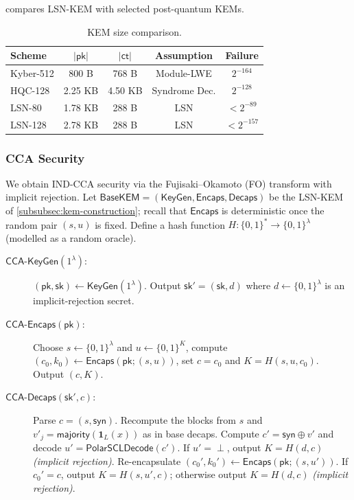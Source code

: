 \documentclass[11pt,a4paper]{article}
\theoremstyle{plain}
\theoremstyle{definition}
\begin{document}
 compares LSN-KEM with selected post-quantum KEMs.

\begin{table}[ht]
\centering
\caption{KEM size comparison.}
\label{tab:kem-sizes}
\begin{tabular}{@{}lcccc@{}}
\hline
Scheme & $|\mathsf{pk}|$ & $|\mathsf{ct}|$ & Assumption & Failure \\
\hline
Kyber-512  & 800 B  & 768 B  & Module-LWE   & $2^{-164}$ \\
HQC-128    & 2.25 KB & 4.50 KB & Syndrome Dec. & $2^{-128}$ \\
LSN-80     & 1.78 KB & 288 B  & LSN          & $< 2^{-89}$ \\
LSN-128    & 2.78 KB & 288 B  & LSN          & $< 2^{-157}$ \\
\hline
\end{tabular}
\end{table}

\subsubsection{CCA Security}
\label{subsubsec:kem-cca}

We obtain IND-CCA security via the Fujisaki--Okamoto (FO) transform \cite{FO99,HHK17} with implicit rejection. Let $\mathsf{BaseKEM}=(\mathsf{KeyGen},\mathsf{Encaps},\mathsf{Decaps})$ be the LSN-KEM of \cref{subsubsec:kem-construction}; recall that $\mathsf{Encaps}$ is deterministic once the random pair $(s,u)$ is fixed. Define a hash function $H:\{0,1\}^*\to\{0,1\}^\lambda$ (modelled as a random oracle).

\begin{description}
\item[$\mathsf{CCA\text{-}KeyGen}(1^\lambda)$:] $(\mathsf{pk},\mathsf{sk})\gets\mathsf{KeyGen}(1^\lambda)$. Output $\mathsf{sk}'=(\mathsf{sk},d)$ where $d\gets\{0,1\}^\lambda$ is an implicit-rejection secret.

\item[$\mathsf{CCA\text{-}Encaps}(\mathsf{pk})$:] Choose $s\gets\{0,1\}^\lambda$ and $u\gets\{0,1\}^K$, compute $(c_0,k_0)\gets\mathsf{Encaps}(\mathsf{pk};(s,u))$, set $c=c_0$ and $K=H(s,u,c_0)$. Output $(c,K)$.

\item[$\mathsf{CCA\text{-}Decaps}(\mathsf{sk}',c)$:] Parse $c=(s,\mathsf{syn})$. Recompute the blocks from $s$ and $v'_j=\mathsf{majority}(\mathbf{1}_L(x))$ as in base decaps. Compute $c'=\mathsf{syn}\oplus v'$ and decode $u'=\mathsf{PolarSCLDecode}(c')$. If $u'=\perp$, output $K=H(d,c)$ \emph{(implicit rejection)}. Re-encapsulate $(c_0',k_0')\gets\mathsf{Encaps}(\mathsf{pk};(s,u'))$. If $c_0'=c$, output $K=H(s,u',c)$; otherwise output $K=H(d,c)$ \emph{(implicit rejection)}.
\end{description}
\end{document}
